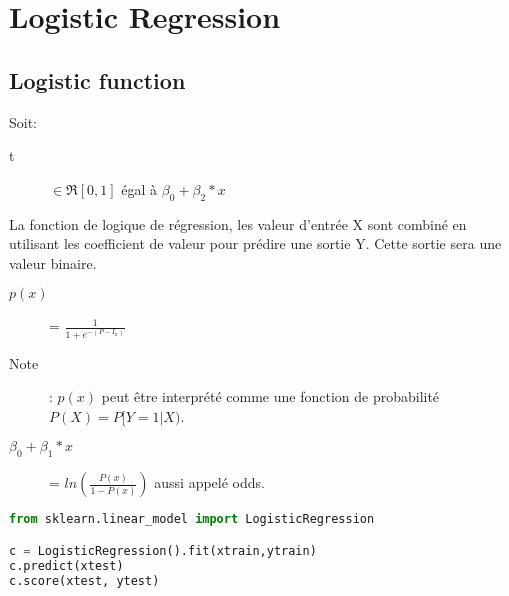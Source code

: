 \section{Logistic Regression}
\subsection{Logistic function}

Soit:
\begin{description}
\item[t] $\in \Re[0,1]$ égal à $\beta_0 + \beta_2 * x$
\end{description}

La fonction de logique de régression, les valeur d'entrée X sont combiné en utilisant les coefficient de valeur pour prédire une sortie Y. Cette sortie sera une valeur binaire.

\begin{description}
\item[$p(x)$] = $ \frac{1}{1 + e^{-(P-I_n)}}$
\item[Note]: $p(x)$ peut être interprété comme une fonction de probabilité $P(X) = P[Y=1 | X)$.
\item[$\beta_0 + \beta_1 * x$] = $ ln(\frac{P(x)}{1 - P(x)})$ aussi appelé odds.
\end{description}

\lstset{style=mlpythoncode}
\begin{lstlisting}[language=Python]
from sklearn.linear_model import LogisticRegression

c = LogisticRegression().fit(xtrain,ytrain)
c.predict(xtest)
c.score(xtest, ytest)
\end{lstlisting}


